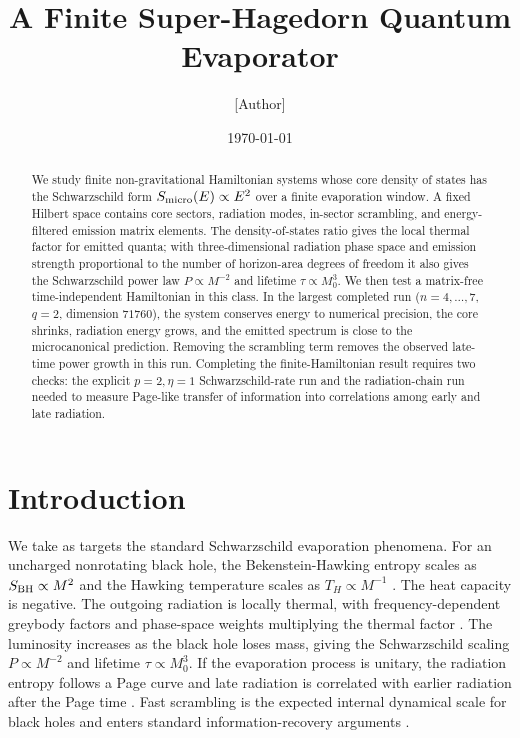 \documentclass[12pt]{article}
\title{A Finite Super-Hagedorn Quantum Evaporator}
\author{[Author]}
\date{\today}
\newcommand{\Smicro}{S_{\rm micro}}
\begin{document}
\hypersetup{pageanchor=false}
\begin{titlingpage}
\maketitle

\begin{abstract}
We study finite non-gravitational Hamiltonian systems whose core density of
states has the Schwarzschild form $\Smicro(E)\propto E^2$ over a finite
evaporation window.  A fixed Hilbert space contains core sectors, radiation
modes, in-sector scrambling, and energy-filtered emission matrix elements.
The density-of-states ratio gives the local thermal factor for emitted quanta;
with three-dimensional radiation phase space and emission strength proportional
to the number of horizon-area degrees of freedom it also gives the Schwarzschild
power law $P\propto M^{-2}$ and lifetime $\tau\propto M_0^3$.  We then test a
matrix-free time-independent Hamiltonian in this class.  In the largest
completed run
($n=4,\ldots,7$, $q=2$, dimension $71760$), the system conserves energy to
numerical precision, the core shrinks, radiation energy grows, and the emitted
spectrum is close to the microcanonical prediction.  Removing the scrambling
term removes the observed late-time power growth in this run.  Completing the
finite-Hamiltonian result requires two checks: the explicit $p=2,\eta=1$
Schwarzschild-rate run and the radiation-chain run needed to measure Page-like
transfer of information into correlations among early and late radiation.
\end{abstract}
\end{titlingpage}
\hypersetup{pageanchor=true}

\section{Introduction}

We take as targets the standard Schwarzschild evaporation phenomena.  For an
uncharged nonrotating black hole, the Bekenstein-Hawking entropy scales as
$S_{\rm BH}\propto M^2$ and the Hawking temperature scales as
$T_H\propto M^{-1}$ \cite{Bekenstein1973,Hawking1975}.  The heat capacity is
negative.  The outgoing radiation is locally thermal, with frequency-dependent
greybody factors and phase-space weights multiplying the thermal factor
\cite{Hawking1975,Page1976}.  The luminosity increases as the black hole loses
mass, giving the Schwarzschild scaling $P\propto M^{-2}$ and lifetime
$\tau\propto M_0^3$.  If the evaporation process is unitary, the radiation
entropy follows a Page curve and late radiation is correlated with earlier
radiation after the Page time \cite{Page1993Info,Page1993Average}.  Fast
scrambling is the expected internal dynamical scale for black holes and enters
standard information-recovery arguments \cite{HaydenPreskill2007,SekinoSusskind2008}.
\end{document}
